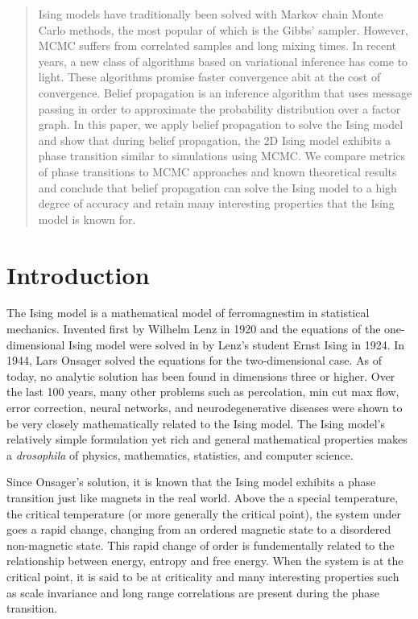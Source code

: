 \documentclass{article}
\begin{document}
\begin{abstract}
    Ising models have traditionally been solved with Markov chain Monte Carlo methods, 
    the most popular of which is the Gibbs’ sampler. However, MCMC suffers from correlated samples and long mixing times. 
    In recent years, a new class of algorithms based on variational inference has come to light. These algorithms promise faster convergence abit at the cost of convergence. 
    Belief propagation is an inference algorithm that uses message passing in order to approximate the probability distribution over a factor graph. 
    In this paper, we apply belief propagation to solve the Ising model and show that during belief propagation, the 2D Ising model exhibits a phase transition similar to simulations using MCMC. We compare metrics of phase transitions to MCMC approaches and known theoretical results and conclude that belief propagation can solve the Ising model to a high degree of accuracy and retain many interesting properties that the Ising model is known for. 
\end{abstract}

\section{Introduction}
\label{Introduction}
    The Ising model is a mathematical model of ferromagnestim in statistical mechanics.
    Invented first by Wilhelm Lenz in 1920 and the equations of the one-dimensional Ising model were solved in by
    Lenz's student Ernst Ising in 1924. In 1944, Lars Onsager solved the equations for the two-dimensional case. 
    As of today, no analytic solution has been found in dimensions three or higher. Over the last 100 years, many other problems such as percolation, min cut max flow, error correction, neural networks, and neurodegenerative diseases were
    shown to be very closely mathematically related to the Ising model. 
    The Ising model's relatively simple formulation yet rich and general mathematical properties makes a \textit{drosophila} of physics, mathematics, statistics, and computer science.

    Since Onsager's solution, it is known that the Ising model exhibits a phase transition just like magnets in the real world. Above the
    a special temperature, the critical temperature (or more generally the critical point), the system under goes a rapid change, changing from an ordered magnetic state to a disordered non-magnetic state. 
    This rapid change of order is fundementally related to the relationship between energy, entropy and free energy. When the system is at the critical point, it is said to be at
    criticality and many interesting properties such as scale invariance and long range correlations are present
    during the phase transition. 
\end{document}
